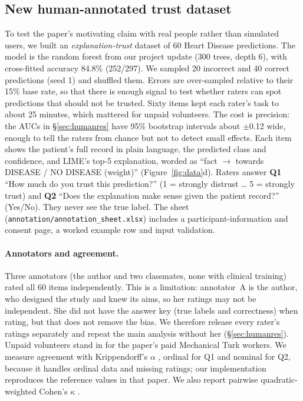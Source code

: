 \documentclass[11pt]{article}
\begin{document}
\subsection{New human-annotated trust dataset}
\label{sec:annot}
To test the paper's motivating claim with real people rather than simulated users, we built an \emph{explanation-trust} dataset of 60 Heart Disease predictions. The model is the random forest from our project update (300 trees, depth 6), with cross-fitted accuracy 84.8\% (252/297). We sampled 20 incorrect and 40 correct predictions (seed 1) and shuffled them. Errors are over-sampled relative to their 15\% base rate, so that there is enough signal to test whether raters can spot predictions that should not be trusted. Sixty items kept each rater's task to about 25 minutes, which mattered for unpaid volunteers. The cost is precision: the AUCs in \S\ref{sec:humanres} have 95\% bootstrap intervals about $\pm$0.12 wide, enough to tell the raters from chance but not to detect small effects. Each item shows the patient's full record in plain language, the predicted class and confidence, and LIME's top-5 explanation, worded as ``fact $\rightarrow$ towards DISEASE / NO DISEASE (weight)'' (Figure~\ref{fig:data}d). Raters answer \textbf{Q1} ``How much do you trust this prediction?'' (1 = strongly distrust \ldots{} 5 = strongly trust) and \textbf{Q2} ``Does the explanation make sense given the patient record?'' (Yes/No). They never see the true label. The sheet (\texttt{annotation/annotation\_sheet.xlsx}) includes a participant-information and consent page, a worked example row and input validation.

\paragraph{Annotators and agreement.} Three annotators (the author and two classmates, none with clinical training) rated all 60 items independently. This is a limitation: annotator~A is the author, who designed the study and knew its aims, so her ratings may not be independent. She did not have the answer key (true labels and correctness) when rating, but that does not remove the bias. We therefore release every rater's ratings separately and repeat the main analysis without her (\S\ref{sec:humanres}). Unpaid volunteers stand in for the paper's paid Mechanical Turk workers. We measure agreement with Krippendorff's $\alpha$ \citep{krippendorff2011}, ordinal for Q1 and nominal for Q2, because it handles ordinal data and missing ratings; our implementation reproduces the reference values in that paper. We also report pairwise quadratic-weighted Cohen's $\kappa$ \citep{cohen1968}.
\end{document}
